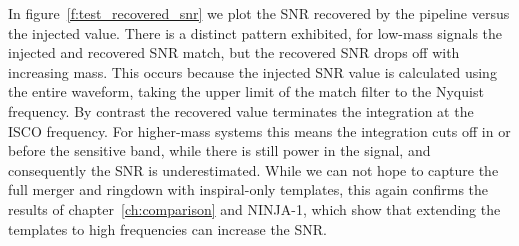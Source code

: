 In figure~\ref{f:test_recovered_snr} we plot the SNR recovered by the
pipeline versus the injected value.  There is a distinct pattern
exhibited, for low-mass signals the injected and recovered SNR match,
but the recovered SNR drops off with increasing mass.  This occurs
because the injected SNR value is calculated using the entire
waveform, taking the upper limit of the match filter to the Nyquist
frequency.  By contrast the recovered value terminates the integration
at the ISCO frequency.  For higher-mass systems this means the
integration cuts off in or before the sensitive band, while there is
still power in the signal, and consequently the SNR is underestimated.
While we can not hope to capture the full merger and ringdown with
inspiral-only templates, this again confirms the results of
chapter~\ref{ch:comparison} and NINJA-1, which show that extending the
templates to high frequencies can increase the SNR.

